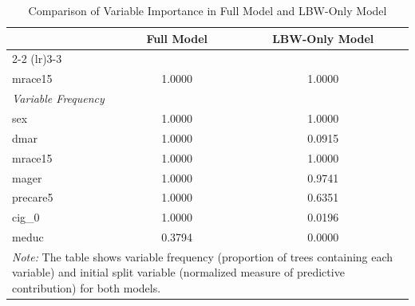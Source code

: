 
\begin{table}[H]
\centering
\caption[Comparison of Variable Importance in Full Model and LBW-Only Model]{Comparison of Variable Importance in Full Model and LBW-Only Model}
\label{tab:var_comparison}
\begin{tabular}{lcc}
\toprule
& \multicolumn{1}{c}{Full Model} & \multicolumn{1}{c}{LBW-Only Model} \\
\cmidrule(lr){2-2} \cmidrule(lr){3-3}
\multicolumn{3}{l}{\textit{Initial Split Variable}} \\
\midrule
mrace15 & 1.0000 & 1.0000 \\
\midrule
\multicolumn{3}{l}{\textit{Variable Frequency}} \\
\midrule
sex & 1.0000 & 1.0000 \\
dmar & 1.0000 & 0.0915 \\
mrace15 & 1.0000 & 1.0000 \\
mager & 1.0000 & 0.9741 \\
precare5 & 1.0000 & 0.6351 \\
cig\_0 & 1.0000 & 0.0196 \\
meduc & 0.3794 & 0.0000 \\
\bottomrule
\multicolumn{3}{p{0.8\textwidth}}{\textit{Note:} The table shows variable frequency (proportion of trees containing each variable) and initial split variable (normalized measure of predictive contribution) for both models.} \\
\end{tabular}
\end{table}

